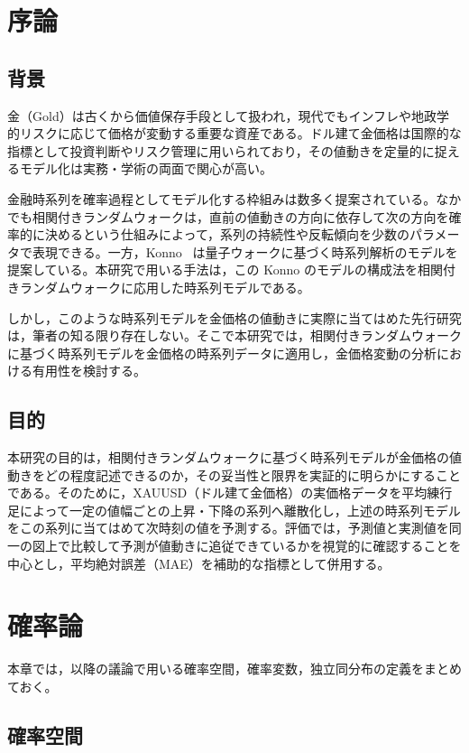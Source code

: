 \documentclass[a4j,dvipdfmx]{jsarticle}
\theoremstyle{plainnote}
\begin{document}
\section{序論}

\subsection{背景}
金（Gold）は古くから価値保存手段として扱われ，現代でもインフレや地政学的リスクに応じて価格が変動する重要な資産である。ドル建て金価格は国際的な指標として投資判断やリスク管理に用いられており，その値動きを定量的に捉えるモデル化は実務・学術の両面で関心が高い。

金融時系列を確率過程としてモデル化する枠組みは数多く提案されている。なかでも相関付きランダムウォークは，直前の値動きの方向に依存して次の方向を確率的に決めるという仕組みによって，系列の持続性や反転傾向を少数のパラメータで表現できる。一方，Konno~\cite{ref3} は量子ウォークに基づく時系列解析のモデルを提案している。本研究で用いる手法は，この Konno のモデルの構成法を相関付きランダムウォークに応用した時系列モデルである。

しかし，このような時系列モデルを金価格の値動きに実際に当てはめた先行研究は，筆者の知る限り存在しない。そこで本研究では，相関付きランダムウォークに基づく時系列モデルを金価格の時系列データに適用し，金価格変動の分析における有用性を検討する。

\subsection{目的}
本研究の目的は，相関付きランダムウォークに基づく時系列モデルが金価格の値動きをどの程度記述できるのか，その妥当性と限界を実証的に明らかにすることである。そのために，XAUUSD（ドル建て金価格）の実価格データを平均練行足によって一定の値幅ごとの上昇・下降の系列へ離散化し，上述の時系列モデルをこの系列に当てはめて次時刻の値を予測する。評価では，予測値と実測値を同一の図上で比較して予測が値動きに追従できているかを視覚的に確認することを中心とし，平均絶対誤差（MAE）を補助的な指標として併用する。

\newpage
\section{確率論}

本章では，以降の議論で用いる確率空間，確率変数，独立同分布の定義をまとめておく。

\subsection{確率空間}
\end{document}
